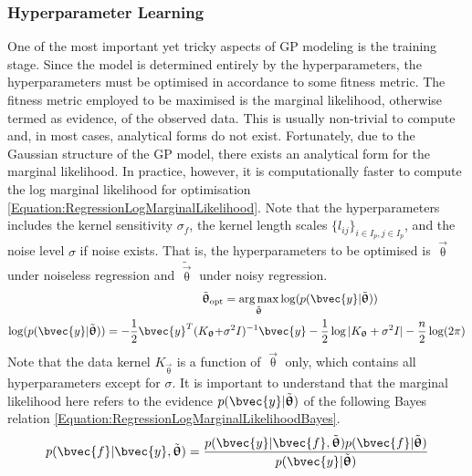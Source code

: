 			\subsubsection{Hyperparameter Learning}
			\label{Background:GaussianProcesses:Regression:HyperparameterLearning}
			
				One of the most important yet tricky aspects of GP modeling is the training stage. Since the model is determined entirely by the hyperparameters, the hyperparameters must be optimised in accordance to some fitness metric. The fitness metric employed to be maximised is the marginal likelihood, otherwise termed as evidence, of the observed data. This is usually non-trivial to compute and, in most cases, analytical forms do not exist. Fortunately, due to the Gaussian structure of the GP model, there exists an analytical form for the marginal likelihood. In practice, however, it is computationally faster to compute the log marginal likelihood for optimisation \eqref{Equation:RegressionLogMarginalLikelihood}. Note that the hyperparameters includes the kernel sensitivity $\sigma_{f}$, the kernel length scales $\{l_{ij}\}_{i \in I_{p}, j \in I_{p}}$, and the noise level $\sigma$ if noise exists. That is, the hyperparameters to be optimised is $\vec{\uptheta}$ under noiseless regression and $\tilde{\vec{\uptheta}}$ under noisy regression. \begin{equation}
					\begin{aligned}
						\tilde{\vec{\uptheta}}_{\mathrm{opt}} &= \argmax_{\tilde{\vec{\uptheta}}} \log(p(\bvec{y} | \tilde{\vec{\uptheta}})) \\
						\log(p(\bvec{y} | \tilde{\vec{\uptheta}})) = - \frac{1}{2} \bvec{y}^{T} (K_{\vec{\uptheta}} + &\sigma^{2} I)^{-1} \bvec{y} - \frac{1}{2} \log|K_{\vec{\uptheta}} + \sigma^{2} I| - \frac{n}{2} \log(2 \pi)
					\end{aligned}
				\label{Equation:RegressionLogMarginalLikelihood}
				\end{equation} Note that the data kernel $K_{\vec{\uptheta}}$ is a function of $\vec{\uptheta}$ only, which contains all hyperparameters except for $\sigma$. It is important to understand that the marginal likelihood here refers to the evidence $p(\bvec{y} | \tilde{\vec{\uptheta}})$ of the following Bayes relation \eqref{Equation:RegressionLogMarginalLikelihoodBayes}. \begin{equation}
					p(\bvec{f} | \bvec{y}, \tilde{\vec{\uptheta}}) = \frac{p(\bvec{y} | \bvec{f}, \tilde{\vec{\uptheta}}) p(\bvec{f} | \tilde{\vec{\uptheta}})}{p(\bvec{y} | \tilde{\vec{\uptheta}})}

\end{equation}
